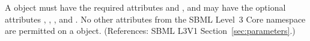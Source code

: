 A \Parameter object must have the required attributes  and
, and may have the optional attributes ,
, ,  and .  No other
attributes from the SBML Level~3 Core namespace are permitted on a
\Parameter object.  (References: SBML L3V1 Section~\ref{sec:parameters}.)
